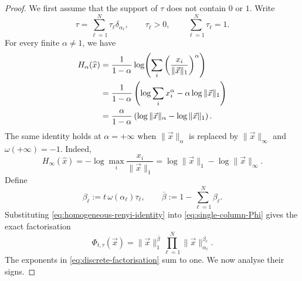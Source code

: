 \documentclass[aps,pra,11pt,onecolumn,nofootinbib,tightenlines]{revtex4-2}
\theoremstyle{definition}
\begin{document}
\begin{proof}
We first assume that the support of $\tau$ does not contain $0$ or $1$. Write
\begin{equation}
 \tau=\sum_{\ell=1}^N\tau_\ell\delta_{\alpha_\ell},
 \qquad
 \tau_\ell>0,
 \qquad
 \sum_{\ell=1}^N\tau_\ell=1.
 \label{eq:discrete-measure}
\end{equation}
For every finite $\alpha\neq1$, we have
\begin{align}
 H_\alpha(\widehat x)
 &=\frac1{1-\alpha}
   \log\!\left(
     \sum_i\left(\frac{x_i}{\|\vec x\|_1}\right)^\alpha
   \right)\notag\\
 &=\frac1{1-\alpha}
   \left(
     \log\sum_i x_i^\alpha
     -\alpha\log\|\vec x\|_1
   \right)\notag\\
 &=\frac{\alpha}{1-\alpha}
   \left(
     \log\|\vec x\|_\alpha-
     \log\|\vec x\|_1
   \right).
 \label{eq:homogeneous-renyi-identity}
\end{align}
The same identity holds at $\alpha=+\infty$ when $\|\vec x\|_\alpha$ is replaced by $\|\vec x\|_\infty$ and $\omega(+\infty)=-1$. Indeed,
\begin{equation}
 H_\infty(\widehat x)
 =-\log\max_i\frac{x_i}{\|\vec x\|_1}
 =\log\|\vec x\|_1-
  \log\|\vec x\|_\infty.
 \label{eq:H-infinity-homogeneous}
\end{equation}
Define
\begin{equation}
 \beta_\ell:=t\,\omega(\alpha_\ell)\tau_\ell,
 \qquad
 \overline\beta:=1-\sum_{\ell=1}^N\beta_\ell.
 \label{eq:discrete-beta-definition}
\end{equation}
Substituting \eqref{eq:homogeneous-renyi-identity} into \eqref{eq:single-column-Phi} gives the exact factorisation
\begin{equation}
 \Phi_{t,\tau}(\vec x)
 =\|\vec x\|_1^{\overline\beta}
  \prod_{\ell=1}^N
  \|\vec x\|_{\alpha_\ell}^{\beta_\ell}.
 \label{eq:discrete-factorisation}
\end{equation}
The exponents in \eqref{eq:discrete-factorisation} sum to one. We now analyse their signs.


\end{proof}
\end{document}
